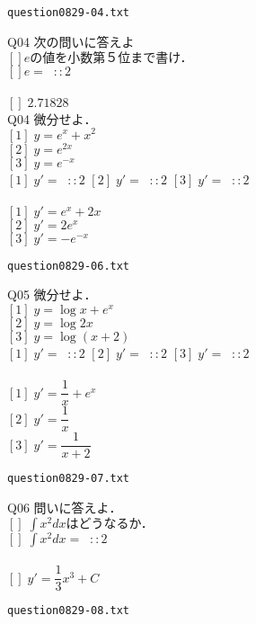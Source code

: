 \documentclass[10pt,dvipdfmx]{jarticle}
\begin{document}
\newpage
\begin{center}
\verb|question0829-04.txt|\\
\end{center}
Q04 
$\text{次の問いに答えよ}$\\
$[]e\text{の値を小数第５位まで書け．}$\\
$[]e=\;\;::2$ 
\\
\\
$[]\;2.71828$\\
Q04 
$\text{微分せよ．}$\\
$[1]\;y=e^{x}+x^{2}$\\
$[2]\;y=e^{2x}$\\
$[3]\;y=e^{-x}$\\
$[1]\;y'=\;\;::2$ 
$[2]\;y'=\;\;::2$ 
$[3]\;y'=\;\;::2$ 
\\
\\
$[1]\;y'=e^{x}+2x$\\
$[2]\;y'=2e^{x}$\\
$[3]\;y'=-e^{-x}$\\
\newpage
\begin{center}
\verb|question0829-06.txt|\\
\end{center}
Q05 
$\text{微分せよ．}$\\
$[1]\;y=\log x +e^{x}$\\
$[2]\;y=\log 2x $\\
$[3]\;y=\log (x+2) $\\
$[1]\;y'=\;\;::2$ 
$[2]\;y'=\;\;::2$ 
$[3]\;y'=\;\;::2$ 
\\
\\
$[1]\;y'=\dfrac{1}{x}+e^{x}$\\
$[2]\;y'=\dfrac{1}{x}$\\
$[3]\;y'=\dfrac{1}{x+2}$\\
\newpage
\begin{center}
\verb|question0829-07.txt|\\
\end{center}
Q06 
$\text{問いに答えよ．}$\\
$[]\;\displaystyle\int x^2 dx \text{はどうなるか．}$\\
$[]\;\displaystyle\int x^2 dx =\;\;::2$ 
\\
\\
$[]\;y'=\dfrac{1}{3}x^3+C$\\
\newpage
\begin{center}
\verb|question0829-08.txt|\\
\end{center}
\end{document}
